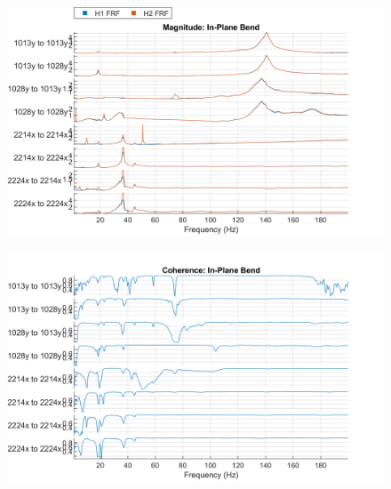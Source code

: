 \begin{figure}[H]
    \centering
    \includegraphics{figs/GVT/mag_In-Plane Bend.png}    
    \label{fig:mag_inPlaneBend}
\end{figure}
\begin{figure}[H]
    \centering
    \includegraphics{figs/GVT/coh_In-Plane Bend.png}
    \label{fig:coh_inPlaneBend}
\end{figure}

